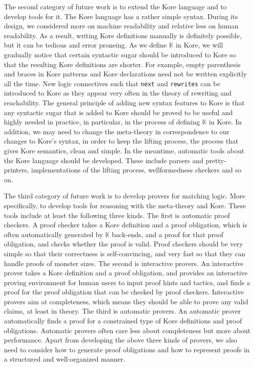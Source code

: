 \documentclass[UTF8,11pt]{article}
\theoremstyle{plain}
\theoremstyle{definition}
\theoremstyle{remark}
\newcommand{\K}{\mbox{$\mathbb{K}$}\xspace}
\newcommand{\slashsymbol}{\symbol{92}}
\newcommand{\slsh}[1]{\texttt{\slashsymbol#1}}
\newcommand{\slnext}{\slsh{next}}
\newcommand{\slrewrites}{\slsh{rewrites}}
\begin{document}
The second category of future work is to extend the Kore language and to 
develop tools for it.
The Kore language has a rather simple syntax.
During its design, we considered more on machine readability and relative less 
on  human readability.
As a result, writing Kore definitions manually is definitely possible, but it 
can be tedious and error proneing.
As we define \K in Kore, we will 
gradually notice that certain syntactic sugar should be introduced to Kore so 
that the resulting Kore definitions are shorter.
For example, empty parenthesis and braces in Kore patterns and Kore 
declarations need not be written explicitly all the time.
New logic connectives such that \texttt{\slnext} and \texttt{\slrewrites} can 
be introduced to Kore as they appear very often in the theory of rewriting and 
reachability.
The general principle of adding new syntax features to Kore is that any 
syntactic sugar that is added to Kore should be proved to be useful and highly 
needed in practice, in particular, in the process of defining \K in Kore.
In addition, we may need to change the meta-theory in correspondence to 
our changes to Kore's syntax, 
in order to keep the lifting process, the process that gives Kore 
semantics, clean and simple.
In the meantime, automatic tools about the Kore language should be developed.
These include parsers and pretty-printers, implementations of the lifting 
process, wellformedness checkers and so on.

The third category of future work is to develop provers for matching logic.
More specifically, to develop tools for reasoning with the meta-theory and Kore.
These tools include at least the following three kinds.
The first is automatic proof checkers.
A proof checker takes a Kore definition and a proof obligation, which is often 
automatically generated by \K back-ends, and a proof for that proof obligation, 
and checks whether the proof is valid.
Proof checkers should be very simple so that their correctness is 
self-convincing, 
and very fast so that they can handle proofs of monster sizes.
The second is interactive provers.
An interactive prover takes a Kore definition and a proof obligation, and 
provides an interactive proving environment for human users to input proof 
hints and tactics, and finds a proof for the proof obligation that can be 
checked by proof checkers.
Interactive provers aim at completeness, which means they should be able to 
prove any valid claims, at least in theory.
The third is automatic provers.
An automatic prover automatically finds a proof for a constrained type of Kore 
definitions and proof obligations.
Automatic provers often care less about completeness but more about performance.
Apart from developing the above three kinds of provers, we also need to 
consider how to generate proof obligations and how to represent proofs in a 
structured and well-organized manner.
\end{document}
